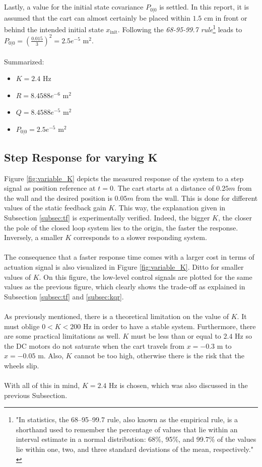 \documentclass[a4paper,kul]{kulakarticle} %
\begin{document}
\\\\
Lastly, a value for the initial state covariance $P_{0|0}$ is settled. In this report, it is assumed that the cart can almost certainly be placed within $1.5$ cm in front or behind the intended initial state $x_{\text{init}}$. Following the \textit{68-95-99.7 rule}\footnote{"In statistics, the 68–95–99.7 rule, also known as the empirical rule, is a shorthand used to remember the percentage of values that lie within an interval estimate in a normal distribution: 68\%, 95\%, and 99.7\% of the values lie within one, two, and three standard deviations of the mean, respectively." \cite{68rule}} leads to $P_{0|0} = \left(\frac{0.015}{3}\right)^2 = 2.5e^{-5}$ m$^2$.
\\\\
Summarized:
\begin{multicols}{2}
	\begin{itemize}
		\item $K = 2.4$ Hz
		\item $R = 8.4588 e^{-6}$ m$^2$
		\item $Q = 8.4588 e^{-5}$ m$^2$
		\item $P_{0|0} = 2.5e^{-5}$ m$^2$
	\end{itemize}
\end{multicols}


\subsection{Step Response for varying K}
Figure \ref{fig:variable_K} depicts the measured response of the system to a step signal as position reference at $t = 0$. The cart starts at a distance of $0.25m$ from the wall and the desired position is $0.05m$ from the wall. This is done for different values of the static feedback gain $K$. This way, the explanation given in Subsection \ref{subsec:tf} is experimentally verified. Indeed, the bigger $K$, the closer the pole of the closed loop system lies to the origin, the faster the response. Inversely, a smaller $K$ corresponds to a slower responding system.
\\\\
The consequence that a faster response time comes with a larger cost in terms of actuation signal is also visualized in Figure \ref{fig:variable_K}. Ditto for smaller values of $K$. On this figure, the low-level control signals are plotted for the same values as the previous figure, which clearly shows the trade-off as explained in Subsection \ref{subsec:tf} and \ref{subsec:kqr}.
\\\\
As previously mentioned, there is a theoretical limitation on the value of $K$. It must oblige $0 < K < 200$ Hz in order to have a stable system. Furthermore, there are some practical limitations as well. $K$ must be less than or equal to $2.4$ Hz so the DC motors do not saturate when the cart travels from $x = -0.3$ m to $x = -0.05$ m. Also, $K$ cannot be too high, otherwise there is the risk that the wheels slip. 
\\\\
With all of this in mind, $K = 2.4$ Hz is chosen, which was also discussed in the previous Subsection.
\end{document}
